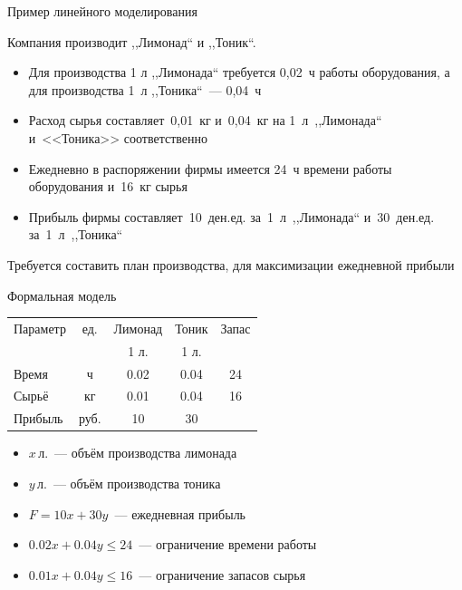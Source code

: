 \documentclass[unicode,11pt,notheorems]{beamer}
\begin{document}
	
	
	
	\begin{frame}{Пример линейного моделирования}{}
		
		Компания производит ,,Лимонад`` и ,,Тоник``.
		\begin{itemize}
			\item Для производства 1 л ,,Лимонада`` требуется 0,02~ч работы оборудования, 
			а для производства 1~л ,,Тоника``~--- 0,04~ч
			
			\item Расход сырья составляет~0,01~кг и~0,04~кг на 1~л~,,Лимонада`` и~<<Тоника>> соответственно
			
			\item Ежедневно в распоряжении фирмы имеется 24~ч времени работы оборудования и~16~кг сырья
			
			\item Прибыль фирмы составляет~10~ден.\;ед. за~1~л~,,Лимонада`` и~30~ден.\;ед. за~1~л~,,Тоника``
		\end{itemize}
		
		\alert{Требуется составить  план производства, для максимизации ежедневной прибыли}
	\end{frame}
	
	\begin{frame}{Формальная модель}{}
		\centering
		\begin{tabular}{|l|c|c|c|c|}
			\hline
			\rowcolor{cyan!40} Параметр& ед. & Лимонад & Тоник  & Запас\\
			\rowcolor{cyan!40}& & 1 л.  & 1 л. & \\
			\hline
			Время  & ч & 0.02 & 0.04 & 24\\
			Сырьё  & кг & 0.01 & 0.04 & 16\\
			\hline
			Прибыль & руб. & 10 & 30 &\\
			\hline
		\end{tabular}
		
		
		\bigskip
		
		\begin{itemize}
			\item \alert{$x$}\,л.~--- объём производства лимонада
			\item \alert{$y$}\,л.~--- объём производства тоника
			\item \alert{$F=10x+30y$}~--- ежедневная прибыль
			\item \alert{$0.02x+0.04y \leqslant 24$}~--- ограничение времени работы
			\item \alert{$0.01x+0.04y \leqslant 16$}~--- ограничение запасов сырья
		\end{itemize}
	\end{frame}
	
\end{document}
